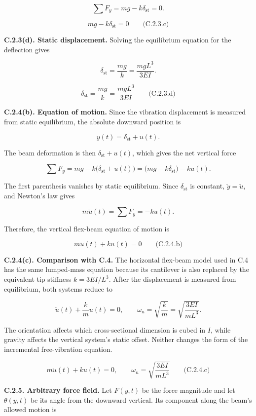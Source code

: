 \[
\sum F_y=mg-k\delta_{\mathrm{st}}=0.
\]

\[
\boxed{mg-k\delta_{\mathrm{st}}=0}
\qquad\text{(C.2.3.c)}
\]

\textbf{C.2.3(d). Static displacement.} Solving the equilibrium equation for the deflection gives

\[
\delta_{\mathrm{st}}=\frac{mg}{k}
 =\frac{mgL^3}{3EI}.
\]

\[
\boxed{\delta_{\mathrm{st}}=\frac{mg}{k}
 =\frac{mgL^3}{3EI}}
\qquad\text{(C.2.3.d)}
\]

\textbf{C.2.4(b). Equation of motion.} Since the vibration displacement is measured from static equilibrium, the absolute downward position is

\[
y(t)=\delta_{\mathrm{st}}+u(t).
\]

The beam deformation is then \(\delta_{\mathrm{st}}+u(t)\), which gives the net vertical force

\[
\sum F_y=mg-k\bigl(\delta_{\mathrm{st}}+u(t)\bigr)
 =\bigl(mg-k\delta_{\mathrm{st}}\bigr)-ku(t).
\]

The first parenthesis vanishes by static equilibrium. Since \(\delta_{\mathrm{st}}\) is constant, \(\ddot y=\ddot u\), and Newton's law gives

\[
m\ddot{u}(t)=\sum F_y=-ku(t).
\]

Therefore, the vertical flex-beam equation of motion is

\[
\boxed{m\ddot{u}(t)+ku(t)=0}
\qquad\text{(C.2.4.b)}
\]

\textbf{C.2.4(c). Comparison with C.4.} The horizontal flex-beam model used in C.4 has the same lumped-mass equation because its cantilever is also replaced by the equivalent tip stiffness \(k=3EI/L^3\). After the displacement is measured from equilibrium, both systems reduce to

\[
\ddot{u}(t)+\frac{k}{m}u(t)=0,
\qquad
\omega_n=\sqrt{\frac{k}{m}}
 =\sqrt{\frac{3EI}{mL^3}}.
\]

The orientation affects which cross-sectional dimension is cubed in \(I\), while gravity affects the vertical system's static offset. Neither changes the form of the incremental free-vibration equation.

\[
\boxed{m\ddot{u}(t)+ku(t)=0,
\qquad \omega_n=\sqrt{\frac{3EI}{mL^3}}}
\qquad\text{(C.2.4.c)}
\]

\textbf{C.2.5. Arbitrary force field.} Let \(F(y,t)\) be the force magnitude and let \(\theta(y,t)\) be its angle from the downward vertical. Its component along the beam's allowed motion is

